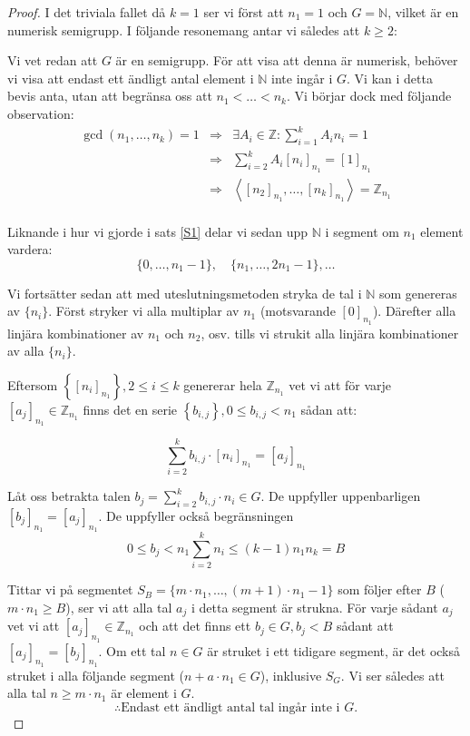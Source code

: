 \begin{proof}
I det triviala fallet då $k=1$ ser vi först att $n_1=1$ och $G=\mathbb{N}$, vilket är en numerisk semigrupp. I följande resonemang antar vi således att $k \geq 2$:

Vi vet redan att $G$ är en semigrupp. För att visa att denna är numerisk, behöver vi visa att endast ett ändligt antal element i $\mathbb{N}$ inte ingår i $G$. Vi kan i detta bevis anta, utan att begränsa oss att $n_1 < \ldots < n_k$. Vi börjar dock med följande observation:
\[\begin{array}{rcl}
\gcd(n_1, \ldots, n_k) = 1 & \Longrightarrow & \exists A_i \in \mathbb{Z} : \displaystyle\sum_{i=1}^{k} A_i n_i = 1 \\
& \Longrightarrow & \displaystyle\sum_{i=2}^{k} A_i \left[n_i\right]_{n_1} = [1]_{n_1} \\[15pt]
& \Longrightarrow & \displaystyle\left< \left[n_2\right]_{n_1}, \ldots, \left[n_k\right]_{n_1} \right> = \mathbb{Z}_{n_1} \\
\end{array}\]

Liknande i hur vi gjorde i sats \ref{S1} delar vi sedan upp $\mathbb{N}$ i segment om $n_1$ element vardera:
\[\{0, \ldots, n_1 - 1\}, \quad \{n_1, \ldots, 2n_1 - 1\}, \ldots\]

Vi fortsätter sedan att med uteslutningsmetoden stryka de tal i $\mathbb{N}$ som genereras av $\{n_i\}$. Först stryker vi alla multiplar av $n_1$ (motsvarande $[0]_{n_1}$). Därefter alla linjära kombinationer av $n_1$ och $n_2$, osv. tills vi strukit alla linjära kombinationer av alla $\{n_i\}$.

Eftersom $\left\{[n_i]_{n_1}\right\}, 2 \leq i \leq k$ genererar hela $\mathbb{Z}_{n_1}$ vet vi att för varje $[a_j]_{n_1} \in \mathbb{Z}_{n_1}$ finns det en serie $\left\{b_{i,j}\right\}, 0 \leq b_{i,j} < n_1$ sådan att: 

\[\sum_{i=2}^{k} b_{i,j} \cdot [n_i]_{n_1} = [a_j]_{n_1}\]

Låt oss betrakta talen $b_j = \sum_{i=2}^{k} b_{i,j} \cdot n_i \in G$. De uppfyller uppenbarligen $[b_j]_{n_1} = [a_j]_{n_1}$. De uppfyller också begränsningen
\[0 \leq b_j < n_1 \sum_{i=2}^{k} n_i \leq (k-1) n_1 n_k = B\] 

Tittar vi på segmentet $S_B = \{m\cdot n_1, \ldots, (m+1)\cdot n_1 - 1\}$ som följer efter $B$ ($m \cdot n_1 \geq B$), ser vi att alla tal $a_j$ i detta segment är strukna. För varje sådant $a_j$ vet vi att $[a_j]_{n_1} \in \mathbb{Z}_{n_1}$ och att det finns ett $b_j \in G, b_j < B$ sådant att $[a_j]_{n_1} = [b_j]_{n_1}$. Om ett tal $n \in G$ är struket i ett tidigare segment, är det också struket i alla följande segment ($n+a \cdot n_1 \in G$), inklusive $S_G$. Vi ser således att alla tal $n \geq m\cdot n_1$ är element i $G$.
\[\therefore \text{Endast ett ändligt antal tal ingår inte i }G.\]
\end{proof}

